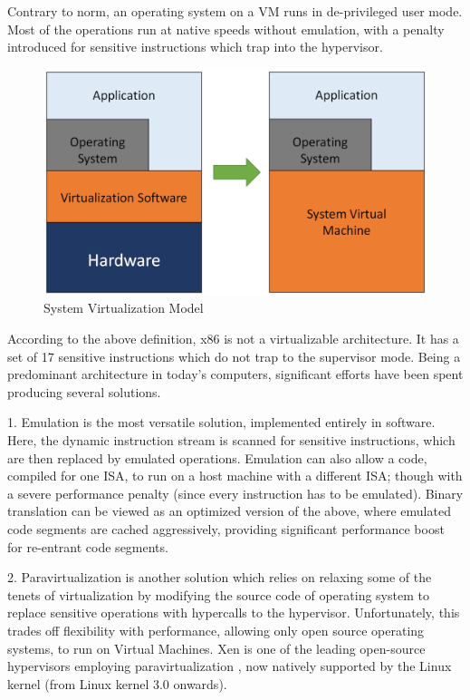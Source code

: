 Contrary to norm, an operating system on a VM runs in de-privileged user mode. Most of the operations run at native speeds without emulation, with a penalty introduced for sensitive instructions which trap into the hypervisor.

\setlength{\belowcaptionskip}{-10pt}

\begin{figure}[H]
  \centering
  \includegraphics[scale=0.6]{figures/sys_virt.png}
  \caption{System Virtualization Model}
  \label{fig:sys_virt}
\end{figure}

According to the above definition, x86 is not a virtualizable architecture. It has a set of 17 sensitive instructions which do not trap to the supervisor mode. Being a predominant architecture in today’s computers, significant efforts have been spent producing several solutions.

1. Emulation is the most versatile solution, implemented entirely in software. Here, the dynamic instruction stream is scanned for sensitive instructions, which are then replaced by emulated operations. Emulation can also allow a code, compiled for one ISA, to run on a host machine with a different ISA; though with a severe performance penalty (since every instruction has to be emulated). Binary translation can be viewed as an optimized version of the above, where emulated code segments are cached aggressively, providing significant performance boost for re-entrant code segments.

2. Paravirtualization is another solution which relies on relaxing some of the tenets of virtualization by modifying the source code of operating system to replace sensitive operations with hypercalls to the hypervisor. Unfortunately, this trades off flexibility with performance, allowing only open source operating systems, to run on Virtual Machines. Xen is one of the leading open-source hypervisors employing paravirtualization \cite{xen_virt}, now natively supported by the Linux kernel (from Linux kernel 3.0 onwards).

